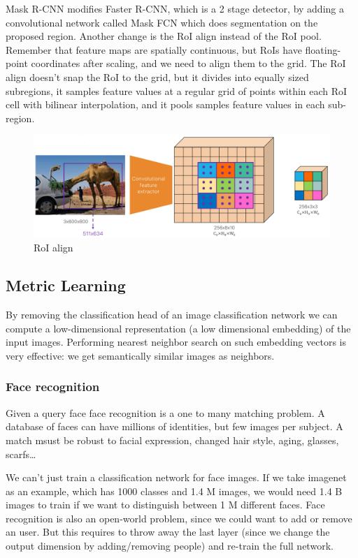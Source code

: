 Mask R-CNN modifies Faster R-CNN, which is a 2 stage detector, by adding a convolutional network called Mask FCN which does segmentation on the proposed region.
Another change is the RoI align instead of the RoI pool.
Remember that feature maps are spatially continuous, but RoIs have floating-point coordinates after scaling, and we need to align them to the grid.
The RoI align doesn't snap the RoI to the grid, but it divides into equally sized subregions, it samples feature values at a regular grid of points within each RoI cell with bilinear interpolation, and it pools samples feature values in each sub-region.

\begin{figure}[htbp]
  \centering
  \includegraphics[width=0.7\linewidth]{./img/roi_align.png}
  \caption{RoI align}
\end{figure}

\subsection{Metric Learning}

By removing the classification head of an image classification network we can compute a low-dimensional representation (a low dimensional embedding) of the input images.
Performing nearest neighbor search on such embedding vectors is very effective: we get semantically similar images as neighbors.

\subsubsection{Face recognition}
Given a query face face recognition is a one to many matching problem.
A database of faces can have millions of identities, but few images per subject.
A match msust be robust to facial expression, changed hair style, aging, glasses, scarfs\dots

We can't just train a classification network for face images.
If we take imagenet as an example, which has 1000 classes and 1.4 M images, we would need 1.4 B images to train if we want to distinguish between 1 M different faces.
Face recognition is also an open-world problem, since we could want to add or remove an user.
But this requires to throw away the last layer (since we change the output dimension by adding/removing people) and re-train the full network.


